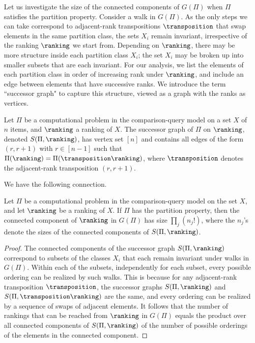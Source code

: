 \documentclass{toc}
\begin{document}
Let us investigate the size of the connected components of $G(\Pi)$ when $\Pi$ satisfies the partition property. Consider a walk in $G(\Pi)$. As the only steps we can take correspond to adjacent-rank transpositions $\transposition$ that swap elements in the same partition class, the sets $X_i$ remain invariant, irrespective of the ranking $\ranking$ we start from. Depending on $\ranking$, there may be more structure inside each partition class $X_i$; the set $X_i$ may be broken up into smaller subsets that are each invariant. For our analysis, we list the elements of each partition class in order of increasing rank under $\ranking$, and include an edge between elements that have successive ranks. We introduce the term ``successor graph" to capture this structure, viewed as a graph with the ranks as vertices.
\begin{definition}
Let $\Pi$ be a computational problem in the comparison-query model on a set $X$ of $n$ items, and $\ranking$ a ranking of $X$. The successor graph of $\Pi$ on $\ranking$, denoted $S(\Pi,\ranking)$, has vertex set $[n]$ and contains all edges of the form $(r,r+1)$ with $r \in [n-1]$ such that $\Pi(\ranking) = \Pi(\transposition \ranking)$, where $\transposition$ denotes the adjacent-rank transposition $(r,r+1)$.
\end{definition}

We have the following connection.
\begin{proposition}\label{prop:successor:components}
Let $\Pi$ be a computational problem in the comparison-query model on the set $X$, and let $\ranking$ be a ranking of $X$. If $\Pi$ has the partition property, then the connected component of $\ranking$ in $G(\Pi)$ has size $\prod_j (n_j!)$, where the $n_j$'s denote the sizes of the connected components of $S(\Pi,\ranking)$.
\end{proposition}
\begin{proof}
The connected components of the successor graph $S(\Pi,\ranking)$ correspond to subsets of the classes $X_i$ that each remain invariant under walks in $G(\Pi)$. Within each of the subsets, independently for each subset, every possible ordering can be realized by such walks. This is because for any adjacent-rank transposition $\transposition$, the successor graphs $S(\Pi,\ranking)$ and $S(\Pi,\transposition \ranking)$ are the same, and every ordering can be realized by a sequence of swaps of adjacent elements. It follows that the number of rankings that can be reached from $\ranking$ in $G(\Pi)$ equals the product over all connected components of $S(\Pi,\ranking)$ of the number of possible orderings of the elements in the connected component. 
\end{proof}
\end{document}
